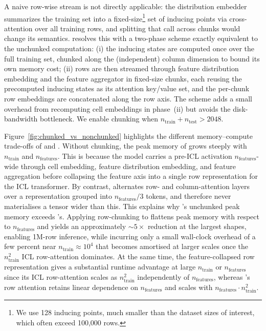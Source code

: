 A naive row-wise stream is not directly applicable: the distribution embedder summarizes the training set into a fixed-size\footnote{We use 128 inducing points, much smaller than the dataset sizes of interest, which often exceed 100,000 rows.} set of inducing points via cross-attention over all training rows, and splitting that call across chunks would change its semantics. \ourmodel resolves this with a two-phase scheme exactly equivalent to the unchunked computation: (i) the inducing states are computed once over the full training set, chunked along the (independent) column dimension to bound its own memory cost; (ii) rows are then streamed through feature distribution embedding and the feature aggregator in fixed-size chunks, each reusing the precomputed inducing states as its attention key/value set, and the per-chunk row embeddings are concatenated along the row axis. The scheme adds a small overhead from recomputing cell embeddings in phase~(ii) but avoids the disk-bandwidth bottleneck. We enable chunking when $n_\mathrm{train}+n_\mathrm{test} > 2048$.

Figure~\ref{fig:chunked_vs_nonchunked} highlights the different memory–compute trade-offs of \ourmodel and \ourmodeltwofive. Without chunking, the peak memory of \ourmodel grows steeply with $n_\mathrm{train}$ and $n_\mathrm{features}$. This is because the model carries a pre-ICL activation $n_\mathrm{features}$-wide through cell embedding, feature distribution embedding, and feature aggregation before collapsing the feature axis into a single row representation for the ICL transformer. By contrast, \ourmodeltwofive alternates row- and column-attention layers over a representation grouped into $n_\mathrm{features}/3$ tokens, and therefore never materialises a tensor wider than this. This explains why \ourmodel's unchunked peak memory exceeds \ourmodeltwofive's. Applying row-chunking to \ourmodel flattens peak memory with respect to $n_\mathrm{features}$ and yields an approximately ${\sim}5{\times}$ reduction at the largest shapes, enabling 1M-row inference, while incurring only a small wall-clock overhead of a few percent near $n_\mathrm{train}\approx 10^4$ that becomes amortised at larger scales once the $n_\mathrm{train}^2$ ICL row-attention dominates. At the same time, the feature-collapsed row representation gives \ourmodel a substantial runtime advantage at large $n_\mathrm{train}$ or $n_\mathrm{features}$ since its ICL row-attention scales as $n_\mathrm{train}^2$ independently of $n_\mathrm{features}$, whereas \ourmodeltwofive's row attention retains linear dependence on $n_\mathrm{features}$ and scales with $n_\mathrm{features} \cdot n_\mathrm{train}^2$.




